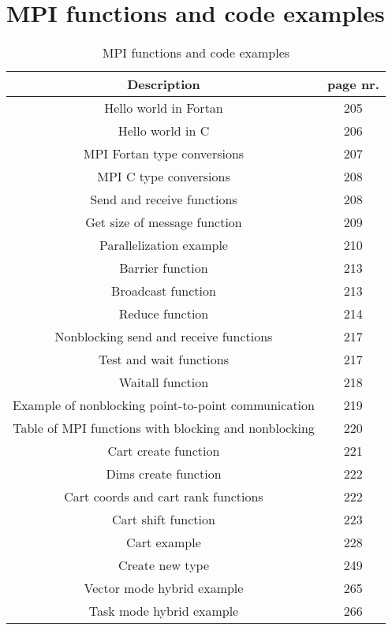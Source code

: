 \documentclass{article}
\begin{document}
	\section{MPI functions and code examples}
		\begin{table}[htbp]
			\centering
			\begin{tabular}{c|c}
				Description & page nr.\\
				\hline
				Hello world in Fortan & 205\\
				Hello world in C & 206\\
				MPI Fortan type conversions & 207\\
				MPI C type conversions & 208\\
				Send and receive functions & 208\\
				Get size of message function & 209\\
				Parallelization example & 210\\
				Barrier function & 213\\
				Broadcast function & 213\\
				Reduce function & 214\\
				Nonblocking send and receive functions & 217\\
				Test and wait functions & 217\\
				Waitall function & 218\\
				Example of nonblocking point-to-point communication & 219\\
				Table of MPI functions with blocking and nonblocking & 220\\
				Cart create function & 221\\
				Dims create function & 222\\
				Cart coords and cart rank functions & 222\\
				Cart shift function & 223\\
				Cart example & 228\\
				Create new type & 249\\
				Vector mode hybrid example & 265\\
				Task mode hybrid example & 266
			\end{tabular}
			\caption{MPI functions and code examples}
		\end{table}
\end{document}
